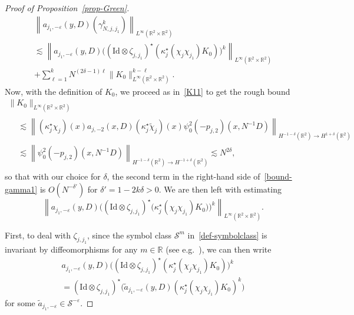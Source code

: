 \documentclass[AHL,Unicode,longabstracts,published]{cedram}
\newcommand{\R}{\mathbb{R}}
\renewcommand{\S}{\mathcal{S}}
\newcommand{\Id}{\mathrm{Id}}
\newcommand{\dl}{\delta}
\newcommand{\eps}{\varepsilon}
\newcommand{\kk}{\kappa}
\newcommand{\wt}{\widetilde}
\newcommand{\les}{\lesssim}
\begin{document}
\begin{proof}[Proof of Proposition~\ref{prop-Green}]
\begin{multline}\label{bound-gamma1}
\left\| a_{j_1,-\eps}(y,D)\left(\gamma_{N,j,j_1}^k\right)\right\|_{L^{\infty}\left(\R^2\times\R^2\right)}\\
\les \left\| a_{j_1,-\eps}(y,D)\Big(\left(\Id\otimes\zeta_{j,j_1}\right)^{\star}\left(\kk_j^{\star}\left(\chi_j\chi_{j_1}\right)K_0\right)\Big)^k\right\|_{L^{\infty}(\R^2\times\R^2)}\\
+\sum_{\ell=1}^kN^{(2\dl-1)\ell}\|K_0\|_{L^{\infty}(\R^2\times\R^2)}^{k-\ell}.
\end{multline}
Now, with the definition of $K_0$, we proceed as in~\eqref{K11} to get the rough bound
\begin{multline*}
\|K_0\|_{L^{\infty}(\R^2\times\R^2)}\\
\begin{aligned}
&\les \left\|\left(\kk_j^\star\chi_j\right)(x)a_{j,-2}(x,D)\left(\kk_j^\star\widetilde{\chi}_j\right)(x)\psi_0^2(-p_{j,2})\left(x,N^{-1}D\right)\right\|_{H^{-1-\dl}(\R^2)\to H^{1+\dl}(\R^2)}\\
&\les\left\|\psi_0^2(-p_{j,2})\left(x,N^{-1}D\right)\right\|_{H^{-1-\dl}(\R^2)\to H^{-1+\dl}(\R^2)} \les N^{2\dl},
\end{aligned}
\end{multline*}
so that with our choice for $\dl$, the second term in the right-hand side of~\eqref{bound-gamma1} is $O(N^{-\dl'})$ for $\dl'=1-2k\dl>0$. We are then left with estimating
\begin{equation*}
\left\| a_{j_1,-\eps}(y,D)\Big((\Id\otimes\zeta_{j,j_1})^{\star}\big(\kk_j^{\star}(\chi_j\chi_{j_1})K_0\big)\Big)^k\right\|_{L^{\infty}(\R^2\times\R^2)}.
\end{equation*}

First, to deal with $\zeta_{j,j_1}$, since the symbol class $\S^m$ in~\eqref{def-symbolclass} is invariant by diffeomorphisms for any $m\in\R$ (see e.g.~\cite[Theorem~18.1.17]{HormanderIII}), we can then write
\begin{multline*}
a_{j_1,-\eps}(y,D)\Big(\left(\Id\otimes\zeta_{j,j_1}\right)^{\star}\left(\kk_j^{\star}\left(\chi_j\chi_{j_1}\right)K_0\right)\Big)^k\\
=\left(\Id\otimes\zeta_{j,j_1}\right)^\star\Big(\wt a_{j_1,-\eps}(y,D) \left(\kk_j^{\star}\left(\chi_j\chi_{j_1}\right)K_0\right)^k\Big)
\end{multline*}
for some $\wt a_{j_1,-\eps}\in \S^{-\eps}$.


\end{proof}
\end{document}
